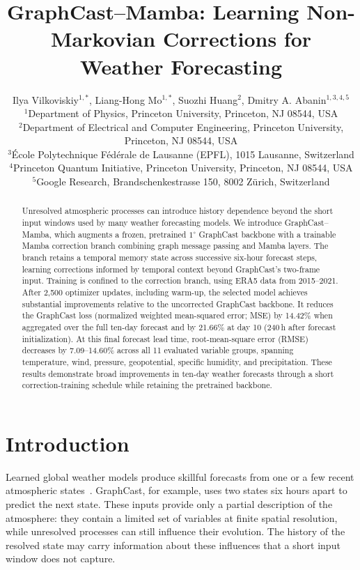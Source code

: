 \documentclass[11pt]{article}
\title{GraphCast--Mamba: Learning Non-Markovian Corrections for Weather Forecasting}
\author{
\normalsize Ilya Vilkoviskiy$^{1,*}$, Liang-Hong Mo$^{1,*}$, Suozhi Huang$^{2}$, Dmitry A. Abanin$^{1,3,4,5}$\\[0.5em]
\small $^{1}$Department of Physics, Princeton University, Princeton, NJ 08544, USA\\
\small $^{2}$Department of Electrical and Computer Engineering, Princeton University,\\
\small Princeton, NJ 08544, USA\\
\small $^{3}$\'Ecole Polytechnique F\'ed\'erale de Lausanne (EPFL), 1015 Lausanne, Switzerland\\
\small $^{4}$Princeton Quantum Initiative, Princeton University, Princeton, NJ 08544, USA\\
\small $^{5}$Google Research, Brandschenkestrasse 150, 8002 Z\"urich, Switzerland
}
\date{}
\begin{document}
\maketitle
\begingroup
\renewcommand{\thefootnote}{{*}}
\endgroup


\begin{abstract}
Unresolved atmospheric processes can introduce history dependence beyond the short input windows used by many weather forecasting models. We introduce GraphCast--Mamba, which augments a frozen, pretrained \(1^\circ\) GraphCast backbone with a trainable Mamba correction branch combining graph message passing and Mamba layers. The branch retains a temporal memory state across successive six-hour forecast steps, learning corrections informed by temporal context beyond GraphCast's two-frame input. Training is confined to the correction branch, using ERA5 data from 2015--2021. After 2,500 optimizer updates, including warm-up, the selected model achieves substantial improvements relative to the uncorrected GraphCast backbone. {It reduces the {GraphCast loss (normalized weighted mean-squared error; MSE)} by 14.42\% when aggregated over the full ten-day forecast and by 21.66\% at day 10 (240\,h after forecast initialization).} {At this final forecast lead time, root-mean-square error (RMSE) decreases by 7.09--14.60\% across all 11 evaluated variable groups, spanning temperature, wind, pressure, geopotential, specific humidity, and precipitation.} These results demonstrate broad improvements in ten-day weather forecasts through a short correction-training schedule while retaining the pretrained backbone.

\end{abstract}



\section{Introduction}

{Learned global weather models produce skillful forecasts from one or a few recent atmospheric states~\citep{bi2023pangu,lam2023graphcast,chen2023fuxi}. GraphCast, for example, uses two states six hours apart to predict the next state. These inputs provide only a partial description of the atmosphere: they contain a limited set of variables at finite spatial resolution, while unresolved processes can still influence their evolution. The history of the resolved state may carry information about these influences that a short input window does not capture.}
\end{document}
